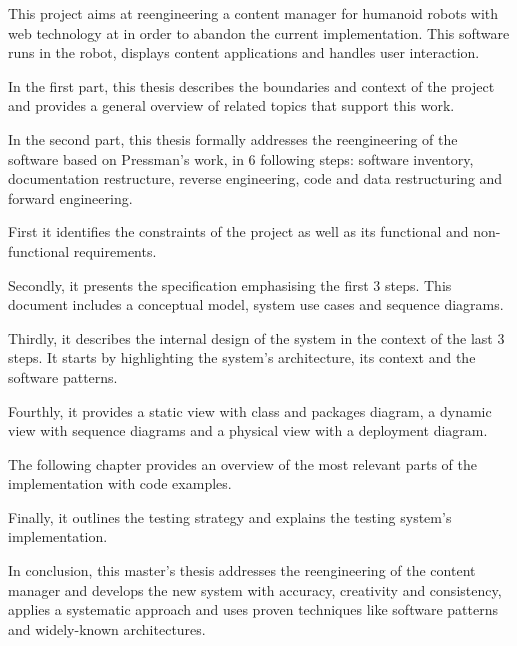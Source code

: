 % 
% 
%

This project aims at reengineering a content manager for humanoid robots with web technology at \company in order to abandon the current \flash implementation.
This software runs in the robot, displays content applications and handles user interaction.

In the first part, this thesis describes the boundaries and context of the project and provides a general overview of related topics that support this work.

In the second part, this thesis formally addresses the reengineering of the software based on Pressman's work, in 6 following steps: software inventory, documentation restructure, reverse engineering, code and data restructuring and forward engineering.

First it identifies the constraints of the project as well as its functional and non-functional requirements.

Secondly, it presents the specification emphasising the first 3 steps.
This document includes a conceptual model, system use cases and sequence diagrams.

Thirdly, it describes the internal design of the system in the context of the last 3 steps.
It starts by highlighting the system's architecture, its context and the software patterns.

Fourthly, it provides a static view with class and packages diagram, a dynamic view with sequence diagrams and a physical view with a deployment diagram.

The following chapter provides an overview of the most relevant parts of the implementation with code examples.

Finally, it outlines the testing strategy and explains the testing system's implementation.

In conclusion, this master's thesis addresses the reengineering of the content manager and develops the new system with accuracy, creativity and consistency, applies a systematic approach and uses proven techniques like software patterns and widely-known architectures.

